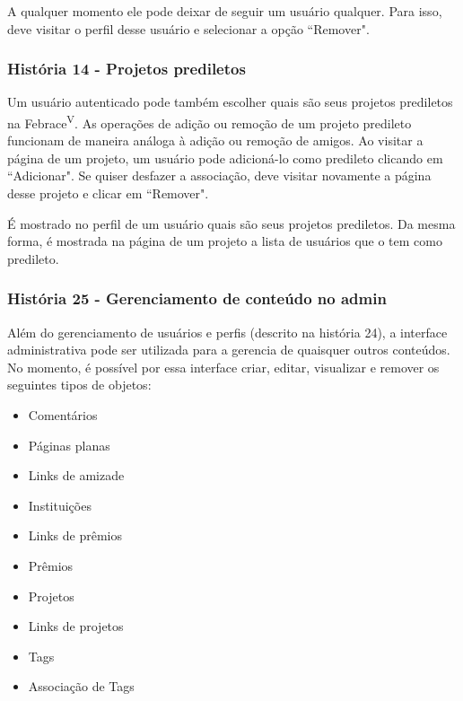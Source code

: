 \documentclass[a4paper,12pt,font=plain,header=plain]{abnt}
\begin{document}
      A qualquer momento ele pode deixar de seguir um usuário qualquer. Para isso, deve visitar o perfil desse usuário e selecionar a opção “Remover".

    \subsubsection{História 14 - Projetos prediletos}
      Um usuário autenticado pode também escolher quais são seus projetos prediletos na Febrace\textsuperscript{V}. As operações de adição ou remoção de um projeto predileto funcionam de maneira análoga à adição ou remoção de amigos. Ao visitar a página de um projeto, um usuário pode adicioná-lo como predileto clicando em “Adicionar". Se quiser desfazer a associação, deve visitar novamente a página desse projeto e clicar em “Remover".

      É mostrado no perfil de um usuário quais são seus projetos prediletos. Da mesma forma, é mostrada na página de um projeto a lista de usuários que o tem como predileto.

    \subsubsection{História 25 - Gerenciamento de conteúdo no admin}
      Além do gerenciamento de usuários e perfis (descrito na história 24), a interface administrativa pode ser utilizada para a gerencia de quaisquer outros conteúdos. No momento, é possível por essa interface criar, editar, visualizar e remover os seguintes tipos de objetos:

      \begin{multicols}{3}
      \begin{itemize}
        \item{Comentários}
        \item{Páginas planas}
        \item{Links de amizade}
        \item{Instituições}
        \item{Links de prêmios}
        \item{Prêmios}
        \item{Projetos}
        \item{Links de projetos}
        \item{Tags}
        \item{Associação de Tags}
      \end{itemize}
      \end{multicols}
\end{document}
